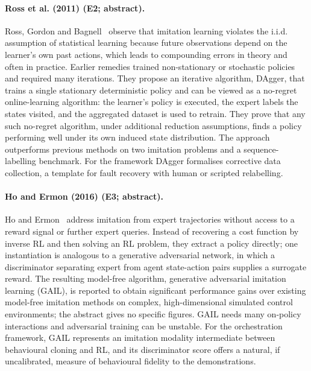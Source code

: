 \documentclass[10pt,a4paper]{article}
\begin{document}
\paragraph{Ross et al. (2011) (E2; abstract).} Ross, Gordon and Bagnell~\cite{Ross2011} observe that imitation learning violates the i.i.d. assumption of statistical learning because future observations depend on the learner's own past actions, which leads to compounding errors in theory and often in practice. Earlier remedies trained non-stationary or stochastic policies and required many iterations. They propose an iterative algorithm, DAgger, that trains a single stationary deterministic policy and can be viewed as a no-regret online-learning algorithm: the learner's policy is executed, the expert labels the states visited, and the aggregated dataset is used to retrain. They prove that any such no-regret algorithm, under additional reduction assumptions, finds a policy performing well under its own induced state distribution. The approach outperforms previous methods on two imitation problems and a sequence-labelling benchmark. For the framework DAgger formalises corrective data collection, a template for fault recovery with human or scripted relabelling.

\paragraph{Ho and Ermon (2016) (E3; abstract).} Ho and Ermon~\cite{Ho2016} address imitation from expert trajectories without access to a reward signal or further expert queries. Instead of recovering a cost function by inverse RL and then solving an RL problem, they extract a policy directly; one instantiation is analogous to a generative adversarial network, in which a discriminator separating expert from agent state-action pairs supplies a surrogate reward. The resulting model-free algorithm, generative adversarial imitation learning (GAIL), is reported to obtain significant performance gains over existing model-free imitation methods on complex, high-dimensional simulated control environments; the abstract gives no specific figures. GAIL needs many on-policy interactions and adversarial training can be unstable. For the orchestration framework, GAIL represents an imitation modality intermediate between behavioural cloning and RL, and its discriminator score offers a natural, if uncalibrated, measure of behavioural fidelity to the demonstrations.
\end{document}
